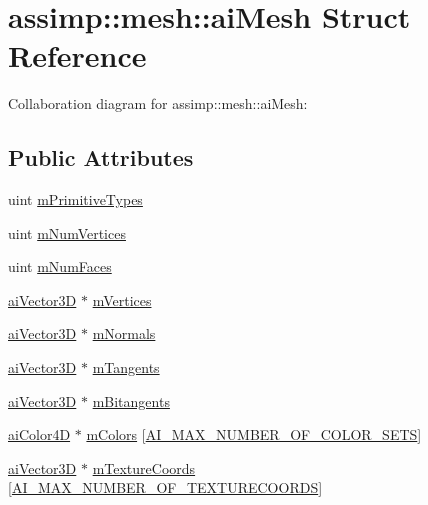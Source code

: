 \hypertarget{structassimp_1_1mesh_1_1ai_mesh}{\section{assimp\+:\+:mesh\+:\+:ai\+Mesh Struct Reference}
\label{structassimp_1_1mesh_1_1ai_mesh}
}


Collaboration diagram for assimp\+:\+:mesh\+:\+:ai\+Mesh\+:
\subsection*{Public Attributes}
\begin{DoxyCompactItemize}
\item 
uint \hyperlink{structassimp_1_1mesh_1_1ai_mesh_a44f34796ead653c34b9cf15cf2ea3ca4}{m\+Primitive\+Types}
\item 
uint \hyperlink{structassimp_1_1mesh_1_1ai_mesh_a86c33abdd6b7fe4c3a722d5c8c16465a}{m\+Num\+Vertices}
\item 
uint \hyperlink{structassimp_1_1mesh_1_1ai_mesh_af29ef83dde764d0a269a219b61381ab6}{m\+Num\+Faces}
\item 
\hyperlink{structai_vector3_d}{ai\+Vector3\+D} $\ast$ \hyperlink{structassimp_1_1mesh_1_1ai_mesh_ae32bf7a3f9169463de97bd33622f8272}{m\+Vertices}
\item 
\hyperlink{structai_vector3_d}{ai\+Vector3\+D} $\ast$ \hyperlink{structassimp_1_1mesh_1_1ai_mesh_aee935013afc416792a945b36f7e99d5f}{m\+Normals}
\item 
\hyperlink{structai_vector3_d}{ai\+Vector3\+D} $\ast$ \hyperlink{structassimp_1_1mesh_1_1ai_mesh_abd53e75d34cbfc0e3e44768c664def15}{m\+Tangents}
\item 
\hyperlink{structai_vector3_d}{ai\+Vector3\+D} $\ast$ \hyperlink{structassimp_1_1mesh_1_1ai_mesh_af4383669a527d07e3d40bfc270d0d882}{m\+Bitangents}
\item 
\hyperlink{structai_color4_d}{ai\+Color4\+D} $\ast$ \hyperlink{structassimp_1_1mesh_1_1ai_mesh_a66060363bc944adb352801b977b3a102}{m\+Colors} \mbox{[}\hyperlink{namespaceassimp_1_1mesh_a8dd324586aa52f6749c07ddd0ddee1b3}{A\+I\+\_\+\+M\+A\+X\+\_\+\+N\+U\+M\+B\+E\+R\+\_\+\+O\+F\+\_\+\+C\+O\+L\+O\+R\+\_\+\+S\+E\+T\+S}\mbox{]}
\item 
\hyperlink{structai_vector3_d}{ai\+Vector3\+D} $\ast$ \hyperlink{structassimp_1_1mesh_1_1ai_mesh_a93b9896f1b98b8368cd3c869ea4f2a98}{m\+Texture\+Coords} \mbox{[}\hyperlink{namespaceassimp_1_1mesh_a3a8dfbb9ee6186e1d78d2a8dfa909a10}{A\+I\+\_\+\+M\+A\+X\+\_\+\+N\+U\+M\+B\+E\+R\+\_\+\+O\+F\+\_\+\+T\+E\+X\+T\+U\+R\+E\+C\+O\+O\+R\+D\+S}\mbox{]}

\end{DoxyCompactItemize}
